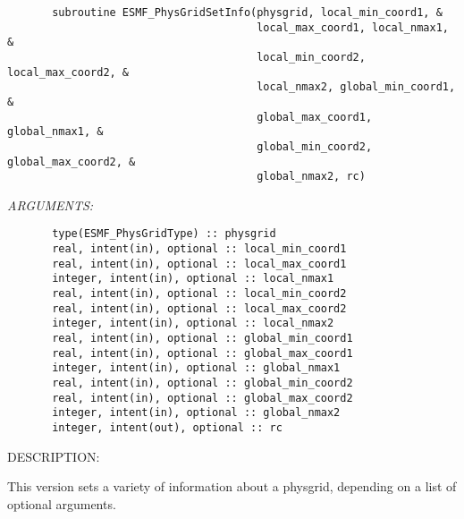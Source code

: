  
\begin{verbatim}       subroutine ESMF_PhysGridSetInfo(physgrid, local_min_coord1, &
                                       local_max_coord1, local_nmax1, &
                                       local_min_coord2, local_max_coord2, &
                                       local_nmax2, global_min_coord1, &
                                       global_max_coord1, global_nmax1, &
                                       global_min_coord2, global_max_coord2, &
                                       global_nmax2, rc)\end{verbatim}{\em ARGUMENTS:}
\begin{verbatim}       type(ESMF_PhysGridType) :: physgrid
       real, intent(in), optional :: local_min_coord1
       real, intent(in), optional :: local_max_coord1
       integer, intent(in), optional :: local_nmax1
       real, intent(in), optional :: local_min_coord2
       real, intent(in), optional :: local_max_coord2
       integer, intent(in), optional :: local_nmax2
       real, intent(in), optional :: global_min_coord1
       real, intent(in), optional :: global_max_coord1
       integer, intent(in), optional :: global_nmax1
       real, intent(in), optional :: global_min_coord2
       real, intent(in), optional :: global_max_coord2
       integer, intent(in), optional :: global_nmax2
       integer, intent(out), optional :: rc              \end{verbatim}
{\sf DESCRIPTION:\\ }


       This version sets a variety of information about a physgrid, depending
       on a list of optional arguments.
  
